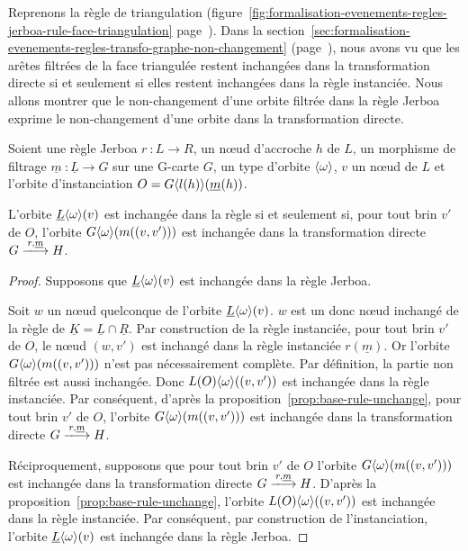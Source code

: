 Reprenons la règle de triangulation
(figure~\ref{fig:formalisation-evenements-regles-jerboa-rule-face-triangulation}
page~\pageref{fig:formalisation-evenements-regles-jerboa-rule-face-triangulation}). %
Dans la
section~\ref{sec:formalisation-evenements-regles-transfo-graphe-non-changement} (page~\pageref{sec:formalisation-evenements-regles-transfo-graphe-non-changement}), nous avons vu que les arêtes filtrées de la face triangulée restent inchangées dans la transformation directe si et seulement si elles restent inchangées dans la règle instanciée. %
Nous allons montrer que le non-changement d'une orbite filtrée dans la règle
Jerboa exprime le non-changement d'une orbite dans la transformation directe. %

\begin{proposition}
	Soient une règle Jerboa $r~: L \longrightarrow R$, un n\oe ud d'accroche $h$ de $L$,
	un morphisme de filtrage $\underline{m}~: \underline{L} \rightarrow G$ sur une G-carte
	$G$, un type d'orbite $\langle\omega\rangle$, $v$ un n\oe ud de $L$ et l'orbite d'instanciation $O = G\langle l(h)\rangle(\underline{m}(h))$.

	L'orbite $\underline{L}\langle\omega\rangle(v)$ est inchangée dans
	la règle si et seulement si, pour tout brin $v'$ de $O$, l'orbite $G\langle\omega\rangle(m((v,v')))$ est
	inchangée dans la transformation directe $G \xlongrightarrow{r,\underline{m}} H$.
\end{proposition}

\begin{proof}
	Supposons que $\underline{L}\langle\omega\rangle(v)$ est inchangée dans la règle Jerboa.

	Soit $w$ un n\oe ud quelconque de l'orbite $\underline{L}\langle\omega\rangle(v)$. %
	$w$ est un donc	n\oe ud inchangé de la règle de $\underline{K} = \underline{L} \cap \underline{R}$. Par construction de la règle
	instanciée, pour tout brin $v'$ de $O$, le n\oe ud $(w,v')$ est inchangé dans la règle instanciée	$r(\underline{m})$. %
	Or l'orbite $G\langle\omega\rangle(m((v,v')))$ n'est pas
	nécessairement complète. %
	Par définition, la partie non filtrée est aussi inchangée. %
	Donc $L(O)\langle\omega\rangle((v,v'))$ est inchangée dans la règle instanciée. %
	Par conséquent, d'après la proposition~\ref{prop:base-rule-unchange}, pour tout brin $v'$ de $O$, l'orbite $G\langle\omega\rangle(m((v,v')))$ est
	inchangée dans la transformation directe $G \xlongrightarrow{r,\underline{m}} H$.

	Réciproquement, supposons que pour tout brin $v'$ de $O$ l'orbite $G\langle\omega\rangle(m((v,v')))$ est
	inchangée dans la transformation directe $G \xlongrightarrow{r, \underline{m}} H$. %
	D'après la proposition~\ref{prop:base-rule-unchange}, l'orbite $L(O)\langle\omega\rangle((v,v'))$  est inchangée
	dans la règle instanciée. %
	Par conséquent, par construction de l'instanciation, l'orbite $\underline{L}\langle\omega\rangle(v)$ est inchangée dans la règle Jerboa. %
\end{proof}

